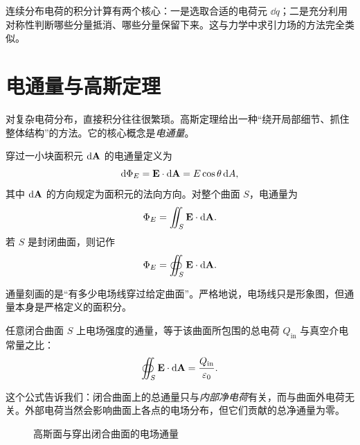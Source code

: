 \begin{remark}
连续分布电荷的积分计算有两个核心：一是选取合适的电荷元 $\dd q$；二是充分利用对称性判断哪些分量抵消、哪些分量保留下来。这与力学中求引力场的方法完全类似。
\end{remark}

\section{电通量与高斯定理}

对复杂电荷分布，直接积分往往很繁琐。高斯定理给出一种“绕开局部细节、抓住整体结构”的方法。它的核心概念是\emph{电通量}。

\begin{definition}[电通量]
穿过一小块面积元 $\dd \vb{A}$ 的电通量定义为
\begin{equation}
\dd \Phi_E = \vb{E}\cdot \dd \vb{A} = E\cos\theta\,\dd A,
\end{equation}
其中 $\dd\vb{A}$ 的方向规定为面积元的法向方向。对整个曲面 $S$，电通量为
\begin{equation}
\Phi_E = \iint_S \vb{E}\cdot \dd \vb{A}.
\end{equation}
若 $S$ 是封闭曲面，则记作
\begin{equation}
\Phi_E = \oiint_S \vb{E}\cdot \dd \vb{A}.
\end{equation}
\end{definition}

通量刻画的是“有多少电场线穿过给定曲面”。严格地说，电场线只是形象图，但通量本身是严格定义的面积分。

\begin{law}[高斯定理]
任意闭合曲面 $S$ 上电场强度的通量，等于该曲面所包围的总电荷 $Q_{\text{in}}$ 与真空介电常量之比：
\begin{equation}
\oiint_S \vb{E}\cdot \dd \vb{A} = \frac{Q_{\text{in}}}{\varepsilon_0}.
\end{equation}
\end{law}

这个公式告诉我们：闭合曲面上的总通量只与\emph{内部净电荷}有关，而与曲面外电荷无关。外部电荷当然会影响曲面上各点的电场分布，但它们贡献的总净通量为零。

\begin{figure}[H]
\centering
{}
\caption{高斯面与穿出闭合曲面的电场通量}
\end{figure}

